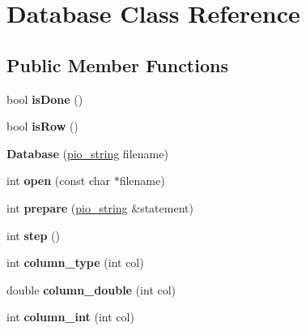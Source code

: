 \hypertarget{class_database}{
\section{Database Class Reference}
\label{class_database}
}
\subsection*{Public Member Functions}
\begin{DoxyCompactItemize}
\item 
\hypertarget{class_database_ab0a1d1538a25bfa00c6352a252b12266}{
bool {\bfseries isDone} ()}
\label{class_database_ab0a1d1538a25bfa00c6352a252b12266}

\item 
\hypertarget{class_database_a35b1670b80ef1613ec46557b39fce747}{
bool {\bfseries isRow} ()}
\label{class_database_a35b1670b80ef1613ec46557b39fce747}

\item 
\hypertarget{class_database_af10802a282835dcaea9f62a228639e83}{
{\bfseries Database} (\hyperlink{classpio__string}{pio\_\-string} filename)}
\label{class_database_af10802a282835dcaea9f62a228639e83}

\item 
\hypertarget{class_database_a35d7c683b9701edfc443de4014a3d2ec}{
int {\bfseries open} (const char $\ast$filename)}
\label{class_database_a35d7c683b9701edfc443de4014a3d2ec}

\item 
\hypertarget{class_database_a3e3011ab9edc71dd2f969396851cafe3}{
int {\bfseries prepare} (\hyperlink{classpio__string}{pio\_\-string} \&statement)}
\label{class_database_a3e3011ab9edc71dd2f969396851cafe3}

\item 
\hypertarget{class_database_ab6315456244d709fe49a6ca1224699b4}{
int {\bfseries step} ()}
\label{class_database_ab6315456244d709fe49a6ca1224699b4}

\item 
\hypertarget{class_database_a77823607f3234bc56cc8c8e5d683987c}{
int {\bfseries column\_\-type} (int col)}
\label{class_database_a77823607f3234bc56cc8c8e5d683987c}

\item 
\hypertarget{class_database_ac87bc4a4accf784bf6a6b5968c4c3848}{
double {\bfseries column\_\-double} (int col)}
\label{class_database_ac87bc4a4accf784bf6a6b5968c4c3848}

\item 
\hypertarget{class_database_a347b2d1f78938aa158f567a8990ce743}{
int {\bfseries column\_\-int} (int col)}
\label{class_database_a347b2d1f78938aa158f567a8990ce743}


\end{DoxyCompactItemize}
